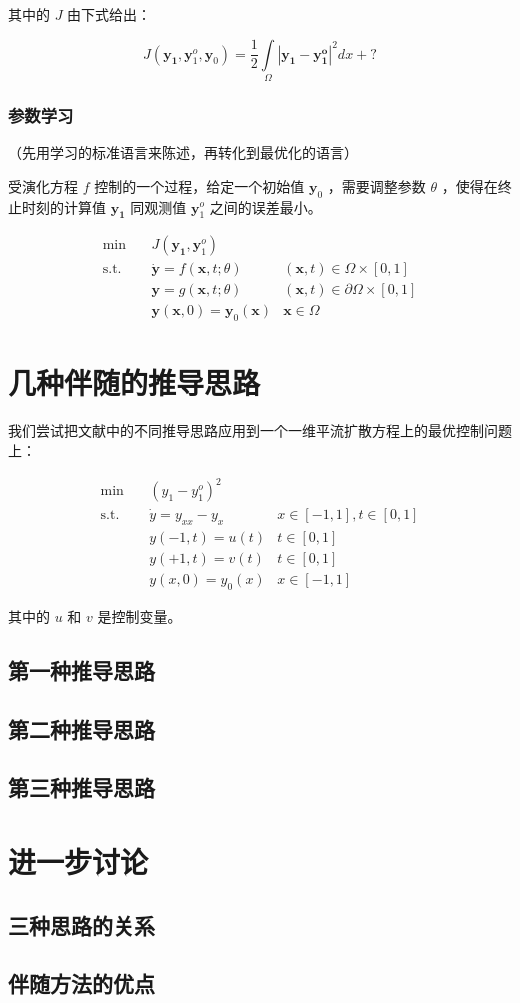 \documentclass[a4paper,12pt]{article}
\begin{document}
其中的 $ J $ 由下式给出：

$$
J(\mathbf{y_1}, \mathbf{y}_1^o, \mathbf{y}_0) = \frac{1}{2} \int\limits_{\Omega}|\mathbf{y_1} - \mathbf{y_1^o}|^2dx + ?
$$

\subsubsection{参数学习}

（先用学习的标准语言来陈述，再转化到最优化的语言）

受演化方程 $ f $ 控制的一个过程，给定一个初始值 $ \mathbf{y}_0 $ ，需要调整参数 $ \theta $ ，使得在终止时刻的计算值 $ \mathbf{y_1} $ 同观测值 $ \mathbf{y}_1^o $ 之间的误差最小。

$$
\begin{array}{rcll}
\min &~& J(\mathbf{y_1}, \mathbf{y}_1^o) & \\
\mathrm{s.t.} &~& \dot{\mathbf{y}} = f(\mathbf{x}, t; \theta) & (\mathbf{x}, t) \in \Omega \times [0, 1] \\
&~& \mathbf{y} = g(\mathbf{x}, t; \theta) & (\mathbf{x}, t) \in \partial \Omega \times [0, 1] \\
&~& \mathbf{y}(\mathbf{x}, 0) = \mathbf{y}_0(\mathbf{x}) & \mathbf{x} \in \Omega
\end{array}
$$

\section{几种伴随的推导思路}

我们尝试把文献中的不同推导思路应用到一个一维平流扩散方程上的最优控制问题上：

$$
\begin{array}{rcll}
\min &~& (y_1 - y_1^o)^2 & \\
\mathrm{s.t.} &~& \dot{y} = y_{xx} - y_x & x \in [-1, 1], t \in [0, 1]\\
&~& y(-1, t) = u(t) & t \in [0, 1]\\
&~& y(+1, t) = v(t) & t \in [0, 1]\\
&~& y(x, 0) = y_0(x) & x \in [-1, 1]
\end{array}
$$

其中的 $ u $ 和 $ v $ 是控制变量。

\subsection{第一种推导思路}

\subsection{第二种推导思路}

\subsection{第三种推导思路}

\section{进一步讨论}

\subsection{三种思路的关系}

\subsection{伴随方法的优点}
\end{document}
